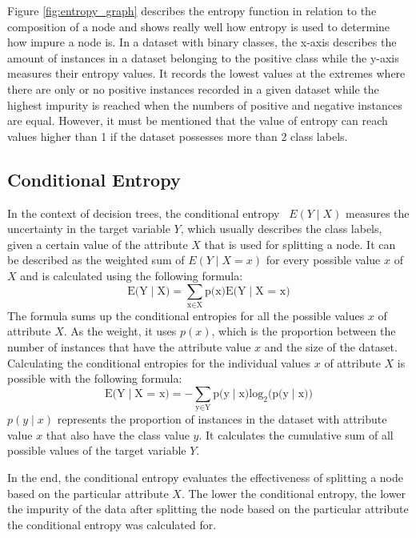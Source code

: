 Figure \ref{fig:entropy_graph} describes the entropy function in relation to the composition of a node and shows really well how entropy is used to determine how impure a node is.
In a dataset with binary classes, the x-axis describes the amount of instances in a dataset belonging to the positive class while the y-axis measures their entropy values. It records the lowest values at the extremes where there are only or no positive instances recorded in a given dataset while the highest impurity is reached when the numbers of positive and negative instances are equal.
However, it must be mentioned that the value of entropy can reach values higher than 1 if the dataset possesses more than 2 class labels. 


\subsection{Conditional Entropy} \label{conditional_entropy}
In the context of decision trees, the conditional entropy~\cite{conditional_entropy_wiki} $E(Y\mid X)$ measures the uncertainty in the target variable $Y$, which usually describes the class labels, given a certain value of the attribute $X$ that is used for splitting a node.
It can be described as the weighted sum of $E(Y\mid X = x)$ for every possible value $x$ of $X$ and is calculated using the following formula:
\[\text{E(Y}\mid \text{X}) = \sum_{\text{x} \in \text{X}} \text{p(x)} \text{E(Y}\mid \text{X = x)}\]
The formula sums up the conditional entropies for all the possible values $x$ of attribute $X$. As the weight, it uses $p(x)$, which is the proportion between the number of instances that have the attribute value $x$ and the size of the dataset.
Calculating the conditional entropies for the individual values $x$ of attribute $X$ is possible with the following formula:
\[ \text{E(Y}\mid \text{X = x)} = -\sum_{\text{y} \in \text{Y}} \text{p(y}\mid \text{x)} \text{log}_\text{2} \text{(p(y}\mid \text{x))} \]
$p(y\mid x)$ represents the proportion of instances in the dataset with attribute value $x$ that also have the class value $y$. It calculates the cumulative sum of all possible values of the target variable $Y$.

In the end, the conditional entropy evaluates the effectiveness of splitting a node based on the particular attribute $X$. The lower the conditional entropy, the lower the impurity of the data after splitting the node based on the particular attribute the conditional entropy was calculated for.

